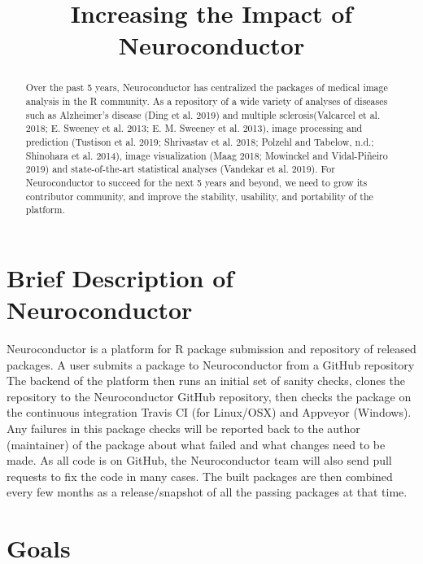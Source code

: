 \documentclass[]{elsarticle} %
\begin{document}
\begin{frontmatter}

  \title{Increasing the Impact of Neuroconductor}
      
  \begin{abstract}
  Over the past 5 years, Neuroconductor has centralized the packages of medical image analysis in the R community. As a repository of a wide variety of analyses of diseases such as Alzheimer's disease (Ding et al. 2019) and multiple sclerosis(Valcarcel et al. 2018; E. Sweeney et al. 2013; E. M. Sweeney et al. 2013), image processing and prediction (Tustison et al. 2019; Shrivastav et al. 2018; Polzehl and Tabelow, n.d.; Shinohara et al. 2014), image visualization (Maag 2018; Mowinckel and Vidal-Piñeiro 2019) and state-of-the-art statistical analyses (Vandekar et al. 2019). For Neuroconductor to succeed for the next 5 years and beyond, we need to grow its contributor community, and improve the stability, usability, and portability of the platform.
  \end{abstract}
  
 \end{frontmatter}

\hypertarget{brief-description-of-neuroconductor}{%
\section{Brief Description of Neuroconductor}\label{brief-description-of-neuroconductor}}

Neuroconductor is a platform for R package submission and repository of released packages. A user submits a package to Neuroconductor from a GitHub repository The backend of the platform then runs an initial set of sanity checks, clones the repository to the Neuroconductor GitHub repository, then checks the package on the continuous integration Travis CI (for Linux/OSX) and Appveyor (Windows). Any failures in this package checks will be reported back to the author (maintainer) of the package about what failed and what changes need to be made. As all code is on GitHub, the Neuroconductor team will also send pull requests to fix the code in many cases. The built packages are then combined every few months as a release/snapshot of all the passing packages at that time.

\hypertarget{goals}{%
\section{Goals}\label{goals}}
\end{document}
